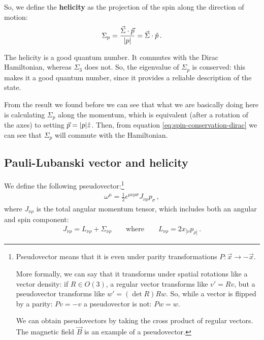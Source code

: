 \documentclass[main.tex]{subfiles}
\begin{document}
So, we define the \textbf{helicity} as the projection of the spin along the direction of motion: 
%
\begin{align}
\Sigma_{p} = \frac{\vec{\Sigma} \cdot \vec{p}}{\abs{p}} = \vec{\Sigma} \cdot \hat{p}
\,.
\end{align}

The helicity is a good quantum number. It commutes with the Dirac Hamiltonian, whereas \(\Sigma_3 \) does not.
So, the eigenvalue of \(\Sigma_{p}\) is conserved: this makes it a good quantum number, since it provides a reliable description of the state.

From the result we found before we can see that what we are basically doing here is calculating \(\Sigma_{p}\) along the momentum, which is equivalent (after a rotation of the axes) to setting \(\vec{p} = \abs{p} \hat{z}\).
Then, from equation \eqref{eq:spin-conservation-dirac} we can see that \(\Sigma_{p}\) will commute with the Hamiltonian.


\subsection{Pauli-Lubanski vector and helicity}

We define the following pseudovector:\footnote{Pseudovector means that it is even under parity transformations \(P : \vec{x} \to - \vec{x}\).

More formally, we can say that it transforms under spatial rotations like a vector density: if \(R \in O(3)\), a regular vector transforms like \(v' = R v\), but a pseudovector transforms like \(w' = (\det R) Rw \). So, while a vector is flipped by a parity: \(Pv = - v\) a pseudovector is not: \(P w = w\).

We can obtain pseudovectors by taking the cross product of regular vectors. The magnetic field \(\vec{B}\) is an example of a pseudovector.
}
%
\begin{align}
\omega^{\mu } = \frac{1}{2} \epsilon^{\mu \nu \rho \sigma } J_{\nu \rho } p_{\sigma }
\,,
\end{align}
%
where \(J_{\nu \rho }\) is the total angular momentum tensor, which includes both an angular and spin component: 
%
\begin{align}
J_{\nu \rho } = L_{\nu \rho } + \Sigma_{\nu \rho } 
\qquad \text{where} \qquad
L_{\nu \rho } = 2 x_{[\nu } p_{\rho  ]}
\,.
\end{align}
\end{document}
